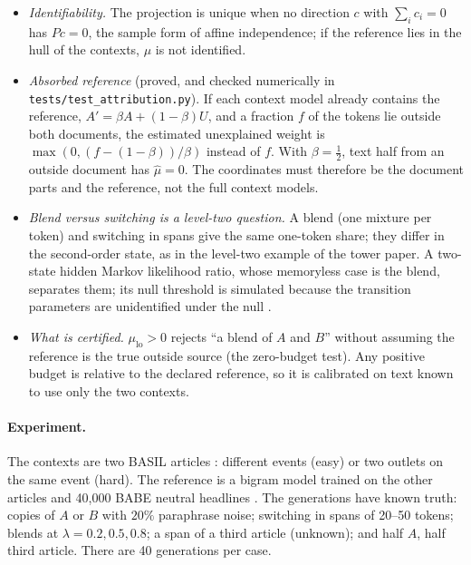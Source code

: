 \documentclass[11pt]{article}
\theoremstyle{definition}
\theoremstyle{remark}
\begin{document}
\begin{itemize}
  \item \emph{Identifiability.} The projection is unique when no direction $c$ with $\sum_ic_i=0$ has $Pc=0$, the sample form of affine independence; if the reference lies in the hull of the contexts, $\mu$ is not identified.
  \item \emph{Absorbed reference} (proved, and checked numerically in \texttt{tests/test\_attribution.py}). If each context model already contains the reference, $A'=\beta A+(1-\beta)U$, and a fraction $f$ of the tokens lie outside both documents, the estimated unexplained weight is $\max(0,(f-(1-\beta))/\beta)$ instead of $f$. With $\beta=\tfrac12$, text half from an outside document has $\hat\mu=0$. The coordinates must therefore be the document parts and the reference, not the full context models.
  \item \emph{Blend versus switching is a level-two question.} A blend (one mixture per token) and switching in spans give the same one-token share; they differ in the second-order state, as in the level-two example of the tower paper. A two-state hidden Markov likelihood ratio, whose memoryless case is the blend, separates them; its null threshold is simulated because the transition parameters are unidentified under the null \cite{davies77}.
  \item \emph{What is certified.} $\mu_{\mathrm{lo}}>0$ rejects ``a blend of $A$ and $B$'' without assuming the reference is the true outside source (the zero-budget test). Any positive budget is relative to the declared reference, so it is calibrated on text known to use only the two contexts.
\end{itemize}

\paragraph{Experiment.} The contexts are two BASIL articles \cite{basil}: different events (easy) or two outlets on the same event (hard). The reference is a bigram model trained on the other articles and 40{,}000 BABE neutral headlines \cite{babe}. The generations have known truth: copies of $A$ or $B$ with $20\%$ paraphrase noise; switching in spans of 20--50 tokens; blends at $\lambda=0.2,0.5,0.8$; a span of a third article (unknown); and half $A$, half third article. There are 40 generations per case.
\end{document}

